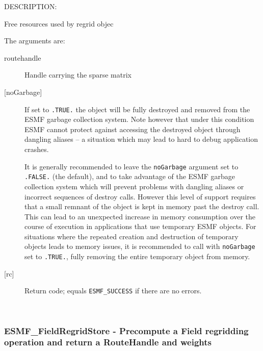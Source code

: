 {\sf DESCRIPTION:\\ }


       Free resources used by regrid objec
  
       The arguments are:
       \begin{description}
       \item [routehandle]
             Handle carrying the sparse matrix
       \item[{[noGarbage]}]
       If set to {\tt .TRUE.} the object will be fully destroyed and removed
       from the ESMF garbage collection system. Note however that under this 
       condition ESMF cannot protect against accessing the destroyed object 
       through dangling aliases -- a situation which may lead to hard to debug 
       application crashes.
   
       It is generally recommended to leave the {\tt noGarbage} argument
       set to {\tt .FALSE.} (the default), and to take advantage of the ESMF 
       garbage collection system which will prevent problems with dangling
       aliases or incorrect sequences of destroy calls. However this level of
       support requires that a small remnant of the object is kept in memory
       past the destroy call. This can lead to an unexpected increase in memory
       consumption over the course of execution in applications that use 
       temporary ESMF objects. For situations where the repeated creation and 
       destruction of temporary objects leads to memory issues, it is 
       recommended to call with {\tt noGarbage} set to {\tt .TRUE.}, fully 
       removing the entire temporary object from memory.
       \item [{[rc]}]
             Return code; equals {\tt ESMF\_SUCCESS} if there are no errors.
       \end{description}
   
 
\mbox{}\hrulefill\ 
 
\subsubsection [ESMF\_FieldRegridStore] {ESMF\_FieldRegridStore - Precompute a Field regridding operation and return a RouteHandle and weights}


